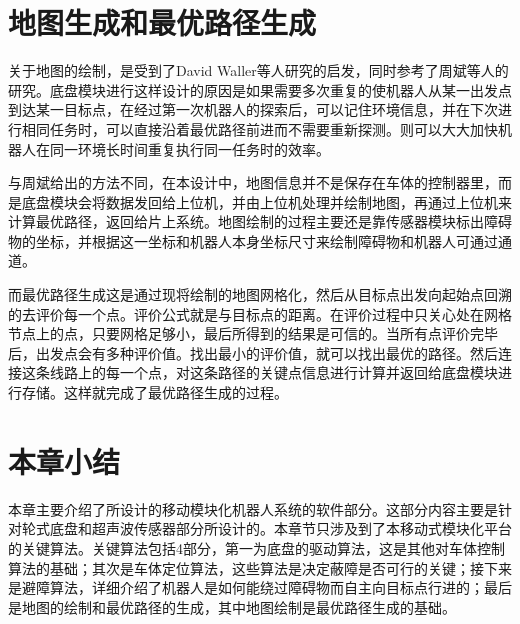 \section{地图生成和最优路径生成}
关于地图的绘制，是受到了David Waller等人研究的启发，同时参考了周斌等人的研究。底盘模块进行这样设计的原因是如果需要多次重复的使机器人从某一出发点到达某一目标点，在经过第一次机器人的探索后，可以记住环境信息，并在下次进行相同任务时，可以直接沿着最优路径前进而不需要重新探测。则可以大大加快机器人在同一环境长时间重复执行同一任务时的效率。

与周斌给出的方法不同，在本设计中，地图信息并不是保存在车体的控制器里，而是底盘模块会将数据发回给上位机，并由上位机处理并绘制地图，再通过上位机来计算最优路径，返回给片上系统。地图绘制的过程主要还是靠传感器模块标出障碍物的坐标，并根据这一坐标和机器人本身坐标尺寸来绘制障碍物和机器人可通过通道。

而最优路径生成这是通过现将绘制的地图网格化，然后从目标点出发向起始点回溯的去评价每一个点。评价公式就是与目标点的距离。在评价过程中只关心处在网格节点上的点，只要网格足够小，最后所得到的结果是可信的。当所有点评价完毕后，出发点会有多种评价值。找出最小的评价值，就可以找出最优的路径。然后连接这条线路上的每一个点，对这条路径的关键点信息进行计算并返回给底盘模块进行存储。这样就完成了最优路径生成的过程。

\section{本章小结}
本章主要介绍了所设计的移动模块化机器人系统的软件部分。这部分内容主要是针对轮式底盘和超声波传感器部分所设计的。本章节只涉及到了本移动式模块化平台的关键算法。关键算法包括4部分，第一为底盘的驱动算法，这是其他对车体控制算法的基础；其次是车体定位算法，这些算法是决定蔽障是否可行的关键；接下来是避障算法，详细介绍了机器人是如何能绕过障碍物而自主向目标点行进的；最后是地图的绘制和最优路径的生成，其中地图绘制是最优路径生成的基础。